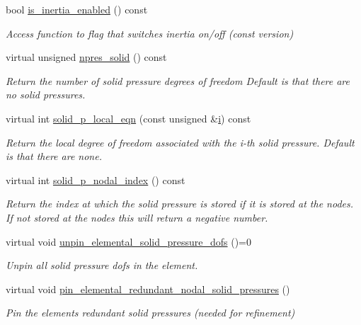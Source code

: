 \begin{DoxyCompactItemize}
bool \hyperlink{classoomph_1_1PVDEquationsBase_a773736f5212c899043a8549931a52c7f}{is\+\_\+inertia\+\_\+enabled} () const
\begin{DoxyCompactList}\small\item\em Access function to flag that switches inertia on/off (const version) \end{DoxyCompactList}\item 
virtual unsigned \hyperlink{classoomph_1_1PVDEquationsBase_a6e8457327151e87d2fa5694148afc7cc}{npres\+\_\+solid} () const
\begin{DoxyCompactList}\small\item\em Return the number of solid pressure degrees of freedom Default is that there are no solid pressures. \end{DoxyCompactList}\item 
virtual int \hyperlink{classoomph_1_1PVDEquationsBase_a30d30a7dd711c84a175bf820ea56e3ef}{solid\+\_\+p\+\_\+local\+\_\+eqn} (const unsigned \&\hyperlink{cfortran_8h_adb50e893b86b3e55e751a42eab3cba82}{i}) const
\begin{DoxyCompactList}\small\item\em Return the local degree of freedom associated with the i-\/th solid pressure. Default is that there are none. \end{DoxyCompactList}\item 
virtual int \hyperlink{classoomph_1_1PVDEquationsBase_a2f879db96640898f0c6f1fc8823520d8}{solid\+\_\+p\+\_\+nodal\+\_\+index} () const
\begin{DoxyCompactList}\small\item\em Return the index at which the solid pressure is stored if it is stored at the nodes. If not stored at the nodes this will return a negative number. \end{DoxyCompactList}\item 
virtual void \hyperlink{classoomph_1_1PVDEquationsBase_abd9064a8651728806dda27636b1e5b50}{unpin\+\_\+elemental\+\_\+solid\+\_\+pressure\+\_\+dofs} ()=0
\begin{DoxyCompactList}\small\item\em Unpin all solid pressure dofs in the element. \end{DoxyCompactList}\item 
virtual void \hyperlink{classoomph_1_1PVDEquationsBase_a1e0c99884cc3bad93209bcd19b415fd7}{pin\+\_\+elemental\+\_\+redundant\+\_\+nodal\+\_\+solid\+\_\+pressures} ()
\begin{DoxyCompactList}\small\item\em Pin the element\textquotesingle{}s redundant solid pressures (needed for refinement) \end{DoxyCompactList}\item 

\end{DoxyCompactItemize}
